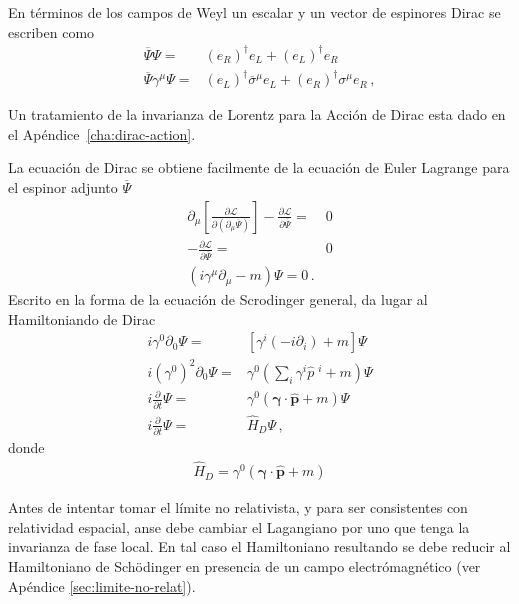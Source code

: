 En términos de los campos de Weyl un escalar y un vector de espinores Dirac se escriben como
\begin{align}
\label{eq:mwd}
  \overline{\Psi}\Psi =& \left( e_R \right)^\dagger e_L+\left( e_L \right)^{\dagger}e_R \nonumber\\
  \overline{\Psi}\gamma^{\mu}\Psi=& (e_L)^{\dagger}\overline{\sigma}^{\mu}e_L+(e_R)^{\dagger}\sigma^{\mu}e_{R}\,,
\end{align}


Un tratamiento de la invarianza de Lorentz para la Acción de Dirac esta dado en el Apéndice~\ref{cha:dirac-action}. 

\begin{frame}
La ecuación de Dirac se obtiene facilmente de la ecuación de Euler Lagrange para el espinor adjunto $\overline{\Psi}$
\begin{align}
  \partial_{\mu}\left[ \frac{\partial\mathcal{L}}{\partial \left( \partial_{\mu} \overline{\Psi} \right)} \right]-\frac{\partial \mathcal{L}}{\partial \overline{\Psi}}=&0 \nonumber\\
-\frac{\partial \mathcal{L}}{\partial \overline{\Psi}}=&0 \nonumber\\
\left( i\gamma^{\mu}\partial_{\mu}-m \right)\Psi=0\,.
\end{align}
Escrito en la forma de la ecuación de Scrodinger general, da lugar al Hamiltoniando de Dirac
\begin{align}
  i\gamma^0 \partial_{0}\Psi=&\left[ \gamma^{i} \left( -i \partial_{i}\right)+m \right]\Psi \nonumber\\
  i \left( \gamma^0 \right)^2 \partial_{0}\Psi=&\gamma^0\left( \sum_i\gamma^{i} \widehat{p}\;^i +m \right)\Psi \nonumber\\
  i \frac{\partial}{\partial t}\Psi=&\gamma^0\left( \boldsymbol{\gamma}\cdot \widehat{\mathbf{p}} +m \right)\Psi \nonumber\\
  i \frac{\partial}{\partial t}\Psi=&\widehat{H}_D\Psi\,,
\end{align}
donde
\begin{align}
  \widehat{H}_D=\gamma^0\left( \boldsymbol{\gamma}\cdot \widehat{\mathbf{p}} +m \right)
\end{align}
\end{frame}
Antes de intentar tomar el límite no relativista, y para ser consistentes con relatividad espacial, anse debe cambiar el Lagangiano por uno que tenga la invarianza de fase local. En tal caso el Hamiltoniano resultando se debe reducir al Hamiltoniano de  Sch\"odinger en presencia de un campo electrómagnético (ver Apéndice \ref{sec:limite-no-relat}).





%
